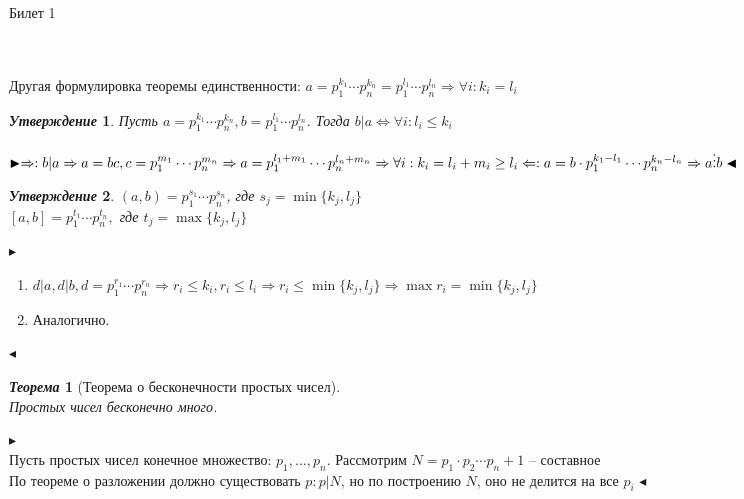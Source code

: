 \documentclass[a4paper,12pt]{article}
\newtheorem{teo}{\textit{Теорема}}
\newtheorem{utv}{\textit{Утверждение}}
\newcommand{\q}{\quad}
\newcommand{\pb}{\blacktriangleright}
\newcommand{\pe}{\blacktriangleleft}
\newcommand{\Ra}{\Rightarrow}
\begin{document}
\begin{mybox}{\hypertarget{bil1}{Билет 1}}
\begin{enumerate}
\end{enumerate}
\q\\\q\\
Другая формулировка теоремы единственности: $a = p_1^{k_1}\cdots p_n^{k_n} = p_1^{l_1}\cdots p_n^{l_n}\Ra \forall i: k_i = l_i$\\
\begin{utv} Пусть $a = p_1^{k_1}\cdots p_n^{k_n}, b = p_1^{l_1}\cdots p_n^{l_n}$. Тогда $b|a\iff \forall i: l_i \le k_i$
\end{utv}
$\pb  \Ra: b|a\Ra a = bc, c = p_1^{m_1}\cdots p_n^{m_n}\Ra a = p_1^{l_1 + m_1}\cdots p_n^{l_n + m_n}\Ra \forall i: k_i = l_i + m_i \ge l_i\\\q\\ \Leftarrow: a = b\cdot p_1^{k_1-l_1}\cdots p_n^{k_n - l_n}\Ra a\vdots b \pe$


\begin{utv} $(a,b) = p_1^{s_1}\cdots p_n^{s_n}$, где $s_j = \min\{k_j, l_j\}$\\
$[a,b] = p_1^{t_1}\cdots p_n^{t_n},$ где $t_j = \max\{k_j, l_j\}$
\end{utv}
$\pb  $
\begin{enumerate}
\item $d|a, d|b, d = p_1^{r_1}\cdots p_n^{r_n}\Ra r_i\le k_i, r_i \le l_i\Ra r_i \le \min\{k_j, l_j\} \Ra \max r_i = \min\{k_j, l_j\}$
\item Аналогично.
\end{enumerate}
$\pe$


\begin{teo}[Теорема о бесконечности простых чисел]\q\\
Простых чисел бесконечно много.
\end{teo}
$\pb     $\\
Пусть простых чисел конечное множество: $p_1,\dots,p_n$. Рассмотрим $N = p_1\cdot p_2\cdots p_n + 1$ -- составное\\
По теореме о разложении должно существовать $p: p|N$, но по построению $N$, оно не делится на все $p_i$
$\pe$
\end{mybox}
\end{document}
